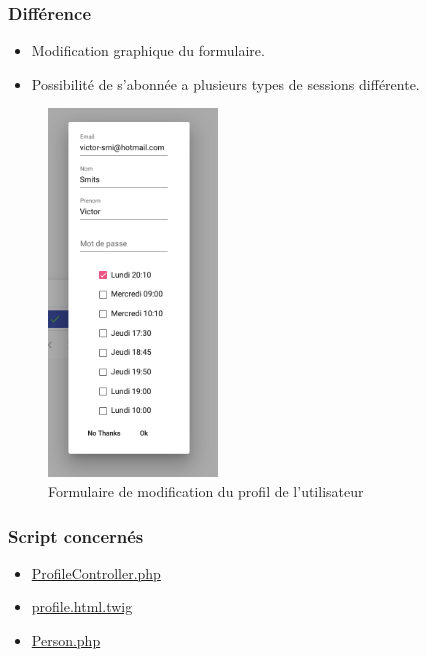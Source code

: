 \subsubsection{Différence}
	\begin{itemize}
		\item Modification graphique du formulaire. 
		\item Possibilité de s'abonnée a plusieurs types de sessions différente. 
	\end{itemize}
	
	\begin{figure}[h]
		\includegraphics[width=0.4\textwidth,center]{Figures/us8-1-angular}
		\caption{Formulaire de modification du profil de l'utilisateur}
	\end{figure}


\vspace{\baselineskip}
\subsubsection{Script concernés}
	\begin{itemize}
		\item \href{https://github.com/victorsmits/Aquabike/blob/master/backend/src/Controller/ProfileController.php}{ProfileController.php}
		\item \href{https://github.com/victorsmits/Aquabike/blob/master/backend/templates/registration/profile.html.twig}{profile.html.twig}
		\item \href{https://github.com/victorsmits/Aquabike/blob/master/backend/src/Entity/Person.php}{Person.php}
	\end{itemize}